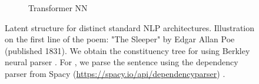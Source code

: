 \begin{figure}[htb!]
\begin{subfigure}[b]{0.475\textwidth}
        \caption{Transformer NN}
        \label{subfig:structure-6}
    \end{subfigure}
    \caption{Latent structure for distinct standard NLP architectures. Illustration on the first line of the poem: "The Sleeper" by Edgar Allan Poe (published 1831). We obtain the constituency tree for  using Berkley neural parser \parencite{klein_18}. For , we parse the sentence using the dependency parser from Spacy (\url{https://spacy.io/api/dependencyparser}) \parencite{honnibal_15}.} 
\end{figure}







